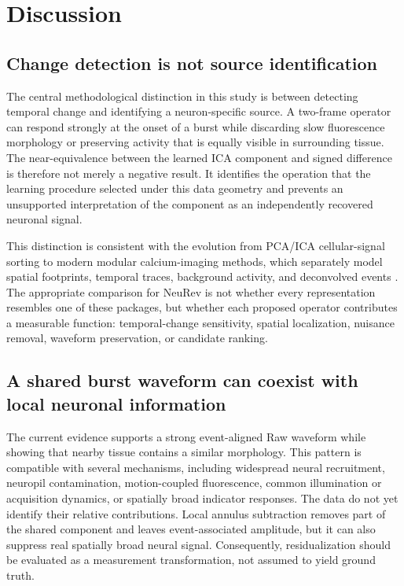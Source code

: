 \section{Discussion}
\label{sec:discussion}

\subsection{Change detection is not source identification}

The central methodological distinction in this study is between detecting temporal change and identifying a neuron-specific source. A two-frame operator can respond strongly at the onset of a burst while discarding slow fluorescence morphology or preserving activity that is equally visible in surrounding tissue. The near-equivalence between the learned ICA component and signed difference is therefore not merely a negative result. It identifies the operation that the learning procedure selected under this data geometry and prevents an unsupported interpretation of the component as an independently recovered neuronal signal.

This distinction is consistent with the evolution from PCA/ICA cellular-signal
sorting to modern modular calcium-imaging methods, which separately model
spatial footprints, temporal traces, background activity, and deconvolved
events \citep{mukamel2009automated,pnevmatikakis2016simultaneous,giovannucci2019caiman,zhou2018cnmfe}.
The appropriate comparison for NeuRev is not whether every representation
resembles one of these packages, but whether each proposed operator contributes
a measurable function: temporal-change sensitivity, spatial localization,
nuisance removal, waveform preservation, or candidate ranking.

\subsection{A shared burst waveform can coexist with local neuronal information}

The current evidence supports a strong event-aligned Raw waveform while showing that nearby tissue contains a similar morphology. This pattern is compatible with several mechanisms, including widespread neural recruitment, neuropil contamination, motion-coupled fluorescence, common illumination or acquisition dynamics, or spatially broad indicator responses. The data do not yet identify their relative contributions. Local annulus subtraction removes part of the shared component and leaves event-associated amplitude, but it can also suppress real spatially broad neural signal. Consequently, residualization should be evaluated as a measurement transformation, not assumed to yield ground truth.

